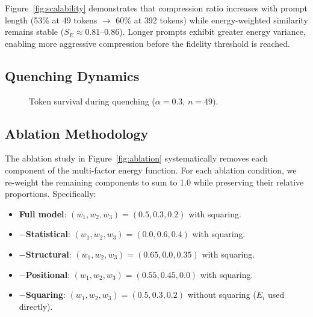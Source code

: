 \documentclass[11pt]{article}
\theoremstyle{remark}
\begin{document}
Figure~\ref{fig:scalability} demonstrates that compression ratio increases
with prompt length (53\% at 49 tokens $\to$ 60\% at 392 tokens) while
energy-weighted similarity remains stable ($S_E \approx 0.81$--$0.86$).
Longer prompts exhibit greater energy variance, enabling more aggressive
compression before the fidelity threshold is reached.

\subsection{Quenching Dynamics}

\begin{figure}[H]
\centering
{}
\caption{Token survival during quenching ($\alpha = 0.3$, $n = 49$).}
\label{fig:cooling-curve}
\end{figure}

\subsection{Ablation Methodology}

The ablation study in Figure~\ref{fig:ablation} systematically removes
each component of the multi-factor energy function. For each ablation
condition, we re-weight the remaining components to sum to 1.0 while
preserving their relative proportions. Specifically:

\begin{itemize}[itemsep=0pt]
    \item \textbf{Full model}: $(w_1, w_2, w_3) = (0.5, 0.3, 0.2)$ with squaring.
    \item \textbf{$-$Statistical}: $(w_1, w_2, w_3) = (0.0, 0.6, 0.4)$ with squaring.
    \item \textbf{$-$Structural}: $(w_1, w_2, w_3) = (0.65, 0.0, 0.35)$ with squaring.
    \item \textbf{$-$Positional}: $(w_1, w_2, w_3) = (0.55, 0.45, 0.0)$ with squaring.
    \item \textbf{$-$Squaring}: $(w_1, w_2, w_3) = (0.5, 0.3, 0.2)$ without squaring ($E_i$ used directly).
\end{itemize}
\end{document}
